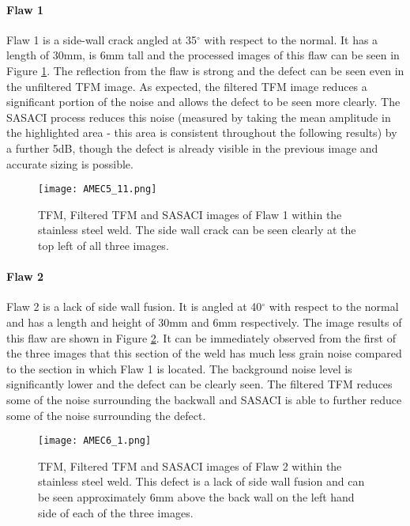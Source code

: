 \paragraph{Flaw 1}

Flaw 1 is a side-wall crack angled at 35$^{\circ}$ with respect to the normal. It has a length of 30mm, is 6mm tall and the processed images of this flaw can be seen in Figure \ref{fig:AMEC_flaw1}. The reflection from the flaw is strong and the defect can be seen even in the unfiltered TFM image. As expected, the filtered TFM image reduces a significant portion of the noise and allows the defect to be seen more clearly. The SASACI process reduces this noise (measured by taking the mean amplitude in the highlighted area - this area is consistent throughout the following results) by a further 5dB, though the defect is already visible in the previous image and accurate sizing is possible. 

\vspace{20mm}

\begin{figure}[h!]
\centering
		\texttt{[image: AMEC5\_11.png]}
		\caption{TFM, Filtered TFM and SASACI images of Flaw 1 within the stainless steel weld. The side wall crack can be seen clearly at the top left of all three images.}
		\label{fig:AMEC_flaw1}
\end{figure}

\clearpage

\paragraph{Flaw 2}

Flaw 2 is a lack of side wall fusion. It is angled at 40$^{\circ}$ with respect to the normal and has a length and height of 30mm and 6mm respectively. The image results of this flaw are shown in Figure \ref{fig:AMEC_flaw2}. It can be immediately observed from the first of the three images that this section of the weld has much less grain noise compared to the section in which Flaw 1 is located. The background noise level is significantly lower and the defect can be clearly seen. The filtered TFM reduces some of the noise surrounding the backwall and SASACI is able to further reduce some of the noise surrounding the defect.

\vspace{20mm}

\begin{figure}[h!]
\centering
		\texttt{[image: AMEC6\_1.png]}
		\caption{TFM, Filtered TFM and SASACI images of Flaw 2 within the stainless steel weld. This defect is a lack of side wall fusion and can be seen approximately 6mm above the back wall on the left hand side of each of the three images.}
		\label{fig:AMEC_flaw2}
\end{figure}

